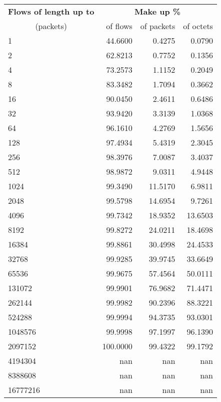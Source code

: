 \begin{tabular}{@{}lrrr@{}}
\toprule
\textbf{Flows of length up to} & \multicolumn{3}{c}{\textbf{Make up \%}} \\
\cmidrule(lr){2-4}
\multicolumn{1}{c}{(packets)} & of flows & of packets & of octets \\
\midrule
1 & 44.6600 & 0.4275 & 0.0790 \\
2 & 62.8213 & 0.7752 & 0.1356 \\
4 & 73.2573 & 1.1152 & 0.2049 \\
8 & 83.3482 & 1.7094 & 0.3662 \\
16 & 90.0450 & 2.4611 & 0.6486 \\
32 & 93.9420 & 3.3139 & 1.0368 \\
64 & 96.1610 & 4.2769 & 1.5656 \\
128 & 97.4934 & 5.4319 & 2.3045 \\
256 & 98.3976 & 7.0087 & 3.4037 \\
512 & 98.9872 & 9.0311 & 4.9448 \\
1024 & 99.3490 & 11.5170 & 6.9811 \\
2048 & 99.5798 & 14.6954 & 9.7261 \\
4096 & 99.7342 & 18.9352 & 13.6503 \\
8192 & 99.8272 & 24.0211 & 18.4698 \\
16384 & 99.8861 & 30.4998 & 24.4533 \\
32768 & 99.9285 & 39.9745 & 33.6649 \\
65536 & 99.9675 & 57.4564 & 50.0111 \\
131072 & 99.9901 & 76.9682 & 71.4471 \\
262144 & 99.9982 & 90.2396 & 88.3221 \\
524288 & 99.9994 & 94.3735 & 93.0301 \\
1048576 & 99.9998 & 97.1997 & 96.1390 \\
2097152 & 100.0000 & 99.4322 & 99.1792 \\
4194304 & nan & nan & nan \\
8388608 & nan & nan & nan \\
16777216 & nan & nan & nan \\
\bottomrule
\end{tabular}


